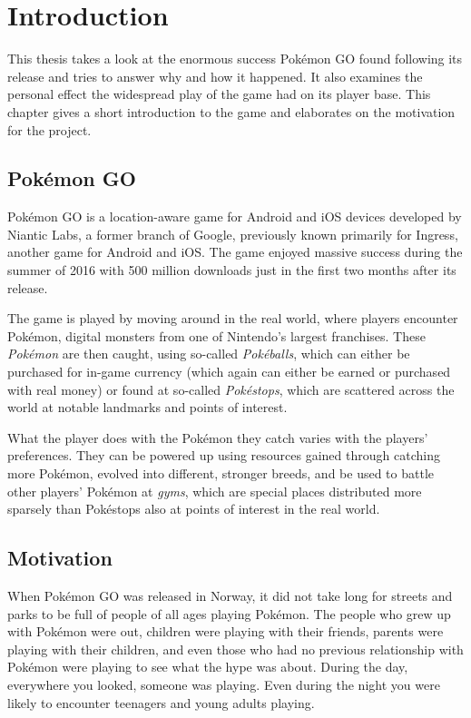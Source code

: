 \chapter{Introduction}
\label{chapter:introduction}

This thesis takes a look at the enormous success Pokémon GO found following its release and tries to answer why and how it happened. It also examines the personal effect the widespread play of the game had on its player base. This chapter gives a short introduction to the game and elaborates on the motivation for the project.

\section{Pokémon GO}
\label{sec:about-pokemon-go}

Pokémon GO is a location-aware game for Android and iOS devices developed by Niantic Labs, a former branch of Google, previously known primarily for Ingress, another game for Android and iOS. The game enjoyed massive success during the summer of 2016 with 500 million downloads just in the first two months after its release.

The game is played by moving around in the real world, where players encounter Pokémon, digital monsters from one of Nintendo's largest franchises. These \emph{Pokémon} are then caught, using so-called \emph{Pokéballs}, which can either be purchased for in-game currency (which again can either be earned or purchased with real money) or found at so-called \emph{Pokéstops}, which are scattered across the world at notable landmarks and points of interest.

What the player does with the Pokémon they catch varies with the players' preferences. They can be powered up using resources gained through catching more Pokémon, evolved into different, stronger breeds, and be used to battle other players' Pokémon at \emph{gyms}, which are special places distributed more sparsely than Pokéstops also at points of interest in the real world.

\section{Motivation}

When Pokémon GO was released in Norway, it did not take long for streets and parks to be full of people of all ages playing Pokémon. The people who grew up with Pokémon were out, children were playing with their friends, parents were playing with their children, and even those who had no previous relationship with Pokémon were playing to see what the hype was about. During the day, everywhere you looked, someone was playing. Even during the night you were likely to encounter teenagers and young adults playing.

